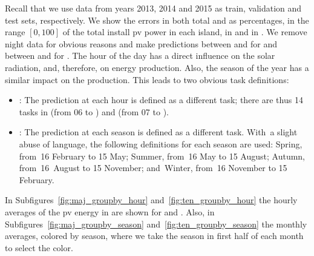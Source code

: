 %
Recall that we use data from years 2013, 2014 and 2015 as train, validation and test sets, respectively.
%
We show the errors in both total \mwhu{} and as percentages, in the range $[0, 100]$ of the total install \acrshort{pv} power in each island, {} in  and  in .
%
We remove night data for obvious reasons and make predictions between  and  {for}  and between  and  for .
%
The hour of the day has a direct influence on the solar radiation, and, therefore, on energy production. Also, the season of the year has a similar impact on the production. This leads to two obvious task definitions:
\begin{itemize}
    \item	{}: The prediction at each hour is defined as a different task; there are thus 14 tasks in  (from 06 to ) and  (from 07 to ).
    \item	{}: The prediction at each season is defined as a different task.  With~a slight abuse of language, the following definitions for each season are used: Spring, from~16 February to 15 May; Summer, from~16 May to 15 August; Autumn, from~16~August to 15 November; and~Winter, from~16 November to 15 February.
\end{itemize}
%
In Subfigures~\ref{fig:maj_groupby_hour} and~\ref{fig:ten_groupby_hour} the hourly averages of the \acrshort{pv} energy in \mwhu{} are shown for  and .
Also, in Subfigures~\ref{fig:maj_groupby_season} and~\ref{fig:ten_groupby_season} the monthly averages, colored by season, where we take the season in first half of each month to select the color.

 





